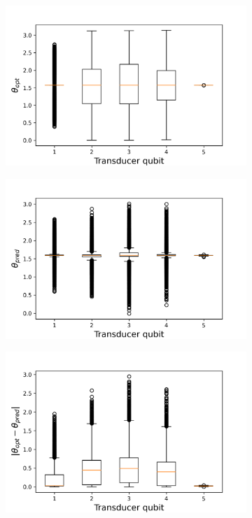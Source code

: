 \begin{figure}[h]
	\centering
	\begin{subfigure}{0.45\textwidth}
		\centering
		\includegraphics[width=\textwidth]{img/theta_opt_box2}
	\end{subfigure}
	\begin{subfigure}{0.45\textwidth}
		\centering
		\includegraphics[width=\textwidth]{img/theta_pred_box2}
	\end{subfigure}
	\begin{subfigure}{0.45\textwidth}
		\centering
		\includegraphics[width=\textwidth]{img/delta_theta_box2}

\end{subfigure}
\end{figure}
